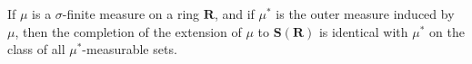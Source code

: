 If $\mu$ is a $\sigma$-finite measure on a ring $\mathbf{R}$, and if $\mu^*$ is the outer measure induced by $\mu$, then the completion of the extension of $\mu$ to $\mathbf{S}(\mathbf{R})$ is identical with $\mu^*$ on the class of all $\mu^*$-measurable sets.
